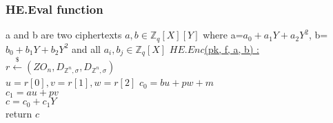 \subsubsection{HE.Eval function}
a and b are two ciphertexts $a,b \in \mathbb{Z}_q[X][Y]$ where a=$a_0 + a_1 Y + a_2 Y^2$, b=$b_0 + b_1 Y + b_2 Y^2$ and all $a_i, b_j \in \mathbb{Z}_q[X]$
\underline{$HE.Enc$(pk, f, a, b) :} 
$r\xleftarrow[]{\$}(ZO_n, D_{\mathbb{Z}^n, \sigma}, D_{\mathbb{Z}^n, \sigma})$ \\
$u=r[0], v=r[1], w=r[2]$
$c_0 = b u + p w + m $ \\
$c_1 = a u + p v $ \\
$c= c_0 +c_1 Y $ \\
return $c$ 